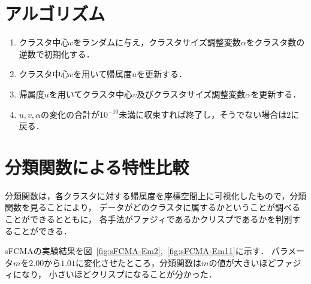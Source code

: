 \documentclass[a4j,12pt,dvipdfmx,oneside]{jsbook}
\theoremstyle{definition}
\begin{document}
 \section{アルゴリズム}\label{sec:artificial_data_algorythm}
  \begin{enumerate}
   \item クラスタ中心$v$をランダムに与え，クラスタサイズ調整変数$\alpha$をクラスタ数の逆数で初期化する．
   \item クラスタ中心$v$を用いて帰属度$u$を更新する．
   \item 帰属度$u$を用いてクラスタ中心$v$及びクラスタサイズ調整変数$\alpha$を更新する．
   \item $u, v, \alpha$の変化の合計が$10^{-10}$未満に収束すれば終了し，そうでない場合は$2$に戻る．
  \end{enumerate}

  \section{分類関数による特性比較}\label{sec:classification_function}

  分類関数は，各クラスタに対する帰属度を座標空間上に可視化したもので，分類関数を見ることにより，
  データがどのクラスタに属するかということが調べることができるとともに，
  各手法がファジィであるかクリスプであるかを判別することができる．
  
  sFCMAの実験結果を図~\ref{fig:sFCMA-Em2},~\ref{fig:sFCMA-Em11}に示す．
  パラメータ$m$を$2.00$から$1.01$に変化させたところ，分類関数は$m$の値が大きいほどファジィになり，
  小さいほどクリスプになることが分かった．
\end{document}
